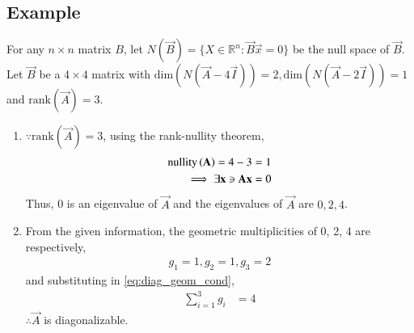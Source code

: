 \subsection{Example}
For any $n\times n$ matrix $B$, let $N(\vec{B})=\{X\in \mathbb{R}^n:\vec{B}\vec{x}=0\}$ be the null space of $\vec{B}$. Let $\vec{B}$ be a $4\times 4$ matrix with $\text{dim}(N(\vec{A}-4\vec{I}))=2, \text{dim}(N(\vec{A}-2\vec{I}))=1$ and $\text{rank}(\vec{A})=3$.
\renewcommand{\theequation}{\theenumi}
\renewcommand{\thefigure}{\theenumi}
\begin{enumerate}[label=\thesubsection.\arabic*.,ref=\thesubsection.\theenumi]

\item  $\because \text{rank}(\vec{A})=3$, using the rank-nullity theorem,
\begin{align}
\text{nullity}\left(\mathbf{A}\right)=4-3 = 1
\\
\implies \exists \mathbf{x} \ni \mathbf{A}\mathbf{x} = 0
\end{align}
Thus, 0 is an eigenvalue of $\vec{A}$ and  the eigenvalues of $\vec{A}$ are $0,2,4$.
\item From the given information, the geometric multiplicities of 0, 2, 4 are respectively,
\begin{align}
g_1 = 1, g_2 = 1, g_3 = 2
\end{align}
and substituting in \ref{eq:diag_geom_cond},
%
\begin{align}
\sum_{i=1}^{3}g_i &= 4
\end{align}
$\therefore \vec{A}$ is diagonalizable.

\end{enumerate}
